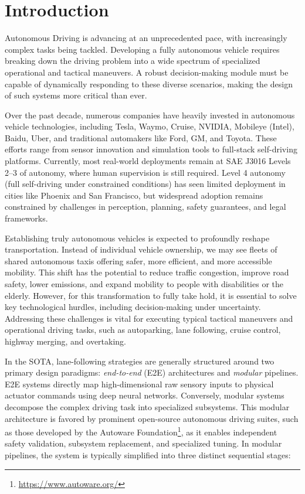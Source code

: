 \documentclass[sn-mathphys,Numbered]{sn-jnl}
\begin{document}
\section{Introduction}

Autonomous Driving is advancing at an unprecedented pace, with increasingly complex tasks being tackled. Developing a fully autonomous vehicle requires breaking down the driving problem into a wide spectrum of specialized operational and tactical maneuvers. A robust decision-making module must be capable of dynamically responding to these diverse scenarios, making the design of such systems more critical than ever.

Over the past decade, numerous companies have heavily invested in autonomous vehicle technologies, including Tesla, Waymo, Cruise, NVIDIA, Mobileye (Intel), Baidu, Uber, and traditional automakers like Ford, GM, and Toyota. These efforts range from sensor innovation and simulation tools to full-stack self-driving platforms. Currently, most real-world deployments remain at SAE J3016 Levels 2–3 of autonomy, where human supervision is still required. Level 4 autonomy (full self-driving under constrained conditions) has seen limited deployment in cities like Phoenix and San Francisco, but widespread adoption remains constrained by challenges in perception, planning, safety guarantees, and legal frameworks.

Establishing truly autonomous vehicles is expected to profoundly reshape transportation. Instead of individual vehicle ownership, we may see fleets of shared autonomous taxis offering safer, more efficient, and more accessible mobility. This shift has the potential to reduce traffic congestion, improve road safety, lower emissions, and expand mobility to people with disabilities or the elderly. However, for this transformation to fully take hold, it is essential to solve key technological hurdles, including decision-making under uncertainty. Addressing these challenges is vital for executing typical tactical maneuvers and operational driving tasks, such as autoparking, lane following, cruise control, highway merging, and overtaking.

In the SOTA, lane-following strategies are generally structured around two primary design paradigms: \textit{end-to-end} (E2E) architectures and \textit{modular} pipelines. E2E systems directly map high-dimensional raw sensory inputs to physical actuator commands using deep neural networks. Conversely, modular systems decompose the complex driving task into specialized subsystems. This modular architecture is favored by prominent open-source autonomous driving suites, such as those developed by the Autoware Foundation\footnote{\url{https://www.autoware.org/}}, as it enables independent safety validation, subsystem replacement, and specialized tuning. In modular pipelines, the system is typically simplified into three distinct sequential stages:
\end{document}
